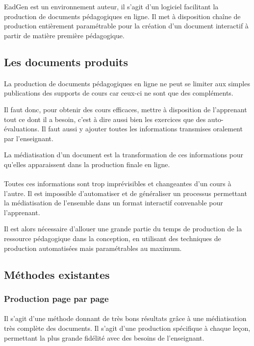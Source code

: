 EadGen est un environnement auteur, il s'agit d'un logiciel facilitant la production de documents pédagogiques en ligne. Il met à disposition chaîne de production entièrement paramétrable pour la création d'un document interactif à partir de \og{}matière première pédagogique\fg.

\subsection{Les documents produits}

\paragraph{}La production de documents pédagogiques en ligne ne peut se limiter aux simples publications des supports de cours car ceux-ci ne sont que des compléments. 

Il faut donc, pour obtenir des cours efficaces, mettre à disposition de l'apprenant tout ce dont il a besoin, c'est à dire aussi bien les exercices que des auto-évaluations. Il faut aussi y ajouter toutes les informations transmises oralement par l'enseignant. 

La médiatisation d'un document est la transformation de ces informations pour qu'elles apparaissent dans la production finale en ligne. 

\paragraph{}Toutes ces informations sont trop imprévisibles et changeantes d'un cours à l'autre. Il est impossible d'automatiser et de généraliser un processus permettant la médiatisation de l'ensemble dans un format interactif convenable pour l'apprenant. 

Il est alors nécessaire d’allouer une grande partie du temps de production de la ressource pédagogique dans la conception, en utilisant des techniques de production automatisées mais paramétrables au maximum.

\subsection{Méthodes existantes}
\subsubsection{Production page par page}
\paragraph{}Il s'agit d'une méthode donnant de très bons résultats grâce à une médiatisation très complète des documents. Il s'agit d'une production spécifique à chaque leçon, permettant la plus grande fidélité avec des besoins de l'enseignant. 

